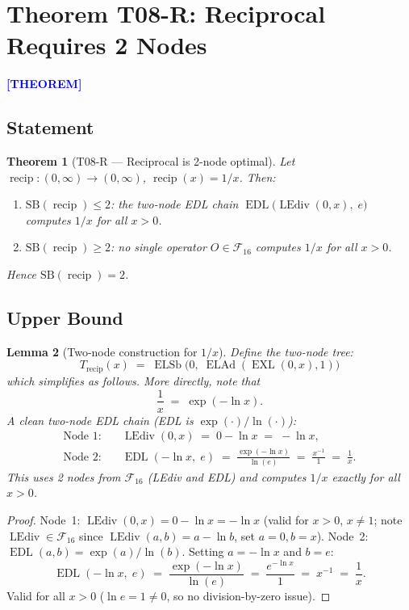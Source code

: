 \documentclass[12pt,a4paper]{article}
\newtheorem{theorem}{Theorem}[section]
\newtheorem{lemma}[theorem]{Lemma}
\theoremstyle{definition}
\newcommand{\EDL}{\operatorname{EDL}}
\newcommand{\EXL}{\operatorname{EXL}}
\newcommand{\ELAd}{\operatorname{ELAd}}
\newcommand{\ELSb}{\operatorname{ELSb}}
\newcommand{\LEdiv}{\operatorname{LEdiv}}
\newcommand{\prooflabel}[1]{%
  \noindent\textbf{\textcolor{blue}{[#1]}}%
}
\newcommand{\F}{\mathcal{F}_{16}}
\newcommand{\SB}{\mathrm{SB}}
\newcommand{\recip}{\operatorname{recip}}
\begin{document}
\section{\texorpdfstring{%
  Theorem T08-R: Reciprocal Requires 2 Nodes}{T08-R: Reciprocal Lower Bound}}
\label{sec:recip}

\prooflabel{THEOREM}

\subsection{Statement}

\begin{theorem}[T08-R --- Reciprocal is 2-node optimal]\label{thm:recip}
Let $\recip : (0,\infty) \to (0,\infty)$, $\recip(x) = 1/x$.
Then:
\begin{enumerate}
  \item[\textup{(i)}]  $\SB(\recip) \leq 2$: the two-node EDL chain
        $\EDL\!\bigl(\LEdiv(0, x),\; e\bigr)$ computes $1/x$ for all $x>0$.
  \item[\textup{(ii)}] $\SB(\recip) \geq 2$: no single operator $O\in\F$
        computes $1/x$ for all $x>0$.
\end{enumerate}
Hence $\SB(\recip) = 2$.
\end{theorem}

\subsection{Upper Bound}

\begin{lemma}[Two-node construction for $1/x$]\label{lem:recip-upper}
Define the two-node tree:
\[
  T_{\recip}(x) \;=\; \ELSb\!\bigl(0,\; \ELAd(\EXL(0,x), 1)\bigr)
\]
which simplifies as follows.  More directly, note that
\[
  \frac{1}{x} \;=\; \exp(-\ln x).
\]
A clean two-node EDL chain (EDL is $\exp(\cdot)/\ln(\cdot)$):
\begin{align}
  \text{Node 1:}\quad & \LEdiv(0, x) \;=\; 0 - \ln x \;=\; -\ln x, \label{eq:recip-n1}\\
  \text{Node 2:}\quad & \EDL(-\ln x,\; e) \;=\; \frac{\exp(-\ln x)}{\ln(e)}
    \;=\; \frac{x^{-1}}{1} \;=\; \frac{1}{x}. \label{eq:recip-n2}
\end{align}
This uses 2 nodes from $\F$ (LEdiv and EDL) and computes $1/x$ exactly for all $x>0$.
\end{lemma}

\begin{proof}
Node~1: $\LEdiv(0,x) = 0 - \ln x = -\ln x$ (valid for $x>0$, $x\neq 1$;
note $\LEdiv \in \F$ since $\LEdiv(a,b) = a - \ln b$, set $a=0, b=x$).
Node~2: $\EDL(a,b) = \exp(a)/\ln(b)$.  Setting $a = -\ln x$ and $b = e$:
\[
  \EDL(-\ln x,\; e) \;=\; \frac{\exp(-\ln x)}{\ln(e)} \;=\; \frac{e^{-\ln x}}{1}
  \;=\; x^{-1} \;=\; \frac{1}{x}.
\]
Valid for all $x>0$ ($\ln e = 1 \neq 0$, so no division-by-zero issue).
\end{proof}
\end{document}
